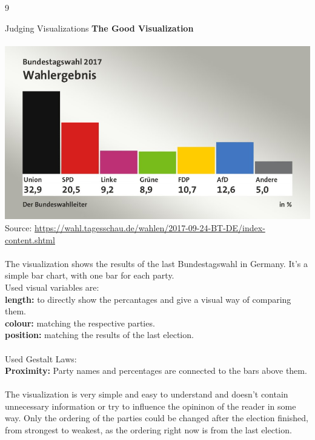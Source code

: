 \documentclass{article}
\begin{document}
\begin{ukon-infie}[17.01.18]{9}
		
		\begin{exercise}[p=8]{Judging Visualizations}
		\textbf{The Good Visualization}\\\\
		\includegraphics[scale=0.5]{good_example.jpg}\\
		Source: \url{https://wahl.tagesschau.de/wahlen/2017-09-24-BT-DE/index-content.shtml}\\\\
		The visualization shows the results of the last Bundestagswahl in Germany. It's a simple bar chart, with one bar for each party.\\
		\newpage
		Used visual variables are:\\
		\textbf{length:} to directly show the percantages and give a visual way of comparing them.\\
		\textbf{colour:} matching the respective parties.\\
		\textbf{position:} matching the results of the last election.\\\\
		Used Gestalt Laws:\\
		\textbf{Proximity:} Party names and percentages are connected to the bars above them.\\\\
		The visualization is very simple and easy to understand and doesn't contain unnecessary information or try to influence the opininon of the reader in some way. 
		Only the ordering of the parties could be changed after the election finished, from strongest to weakest, as the ordering right now is from the last election.\\\\\\
		

\end{exercise}
\end{ukon-infie}
\end{document}
